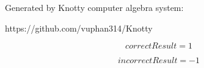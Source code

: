 \documentclass[letterpaper, 10pt]{extarticle}
\begin{document}
Generated by Knotty computer algebra system:

https://github.com/vuphan314/Knotty

\hrulefill

\bigskip

\begin{dmath*}
correctResult =
    1
\end{dmath*}


\begin{dmath*}
incorrectResult =
    -1
\end{dmath*}
\end{document}
